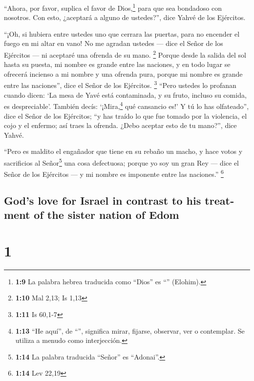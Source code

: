 \begin{paracol}{2}
 ``Ahora, por favor, suplica el favor de Dios,\footnote{\textbf{1:9}
  La palabra hebrea traducida como ``Dios'' es ``''
  (Elohim).} para que sea bondadoso con nosotros. Con esto, ¿aceptará a
alguno de ustedes?'', dice Yahvé de los Ejércitos.

 ``¡Oh, si hubiera entre ustedes uno que cerrara las
puertas, para no encender el fuego en mi altar en vano! No me agradan
ustedes --- dice el Señor de los Ejércitos --- ni aceptaré una ofrenda
de su mano. \footnote{\textbf{1:10} Mal 2,13; Is 1,13} 
Porque desde la salida del sol hasta su puesta, mi nombre es grande
entre las naciones, y en todo lugar se ofrecerá incienso a mi nombre y
una ofrenda pura, porque mi nombre es grande entre las naciones'', dice
el Señor de los Ejércitos. \footnote{\textbf{1:11} Is 60,1-7}
 ``Pero ustedes lo profanan cuando dicen: `La mesa de
Yavé está contaminada, y su fruto, incluso su comida, es despreciable'.
 También decís: `¡Mira,\footnote{\textbf{1:13} ``He
  aquí'', de ``'', significa mirar, fijarse, observar, ver o
  contemplar. Se utiliza a menudo como interjección.} qué cansancio es!'
Y tú lo has olfateado'', dice el Señor de los Ejércitos; ``y has traído
lo que fue tomado por la violencia, el cojo y el enfermo; así traes la
ofrenda. ¿Debo aceptar esto de tu mano?'', dice Yahvé.

 ``Pero es maldito el engañador que tiene en su rebaño un
macho, y hace votos y sacrificios al Señor\footnote{\textbf{1:14} La
  palabra traducida ``Señor'' es ``Adonai''.} una cosa defectuosa;
porque yo soy un gran Rey --- dice el Señor de los Ejércitos --- y mi
nombre es imponente entre las naciones.'' \footnote{\textbf{1:14} Lev
  22,19}

\switchcolumn
\begin{otherlanguage}{english}

\hypertarget{gods-love-for-israel-in-contrast-to-his-treatment-of-the-sister-nation-of-edom}{%
\subsection{God's love for Israel in contrast to his treatment of the
sister nation of
Edom}\label{gods-love-for-israel-in-contrast-to-his-treatment-of-the-sister-nation-of-edom}}

\hypertarget{section-1}{%
\section{1}\label{section-1}}


\end{otherlanguage}
\end{paracol}
